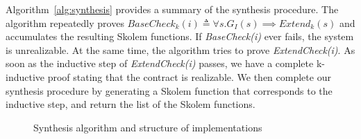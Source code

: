 Algorithm~\ref{alg:synthesis} provides a summary of the synthesis
procedure. The algorithm repeatedly proves $\mathit{BaseCheck_k(i)} \triangleq
\forall s. G_I(s) \implies \mathit{Extend}_k(s)$ and accumulates the resulting Skolem functions. If
\textit{BaseCheck(i)} ever fails, the system is unrealizable. At the same time, the
algorithm tries to prove \textit{ExtendCheck(i)}. As soon as the
inductive step of \textit{ExtendCheck(i)} passes, we have a complete
k-inductive proof stating that the contract is realizable. We then
complete our synthesis procedure by generating a Skolem function that
corresponds to the inductive step, and return the list of the
Skolem functions.

\begin{figure}
\begin{minipage}[t]{0.65\textwidth}
\end{minipage}
\hspace{-1.5cm}
\begin{minipage}[t]{0.38\textwidth}
\end{minipage}
\caption{Synthesis algorithm and structure of implementations}
\label{fig:synthalg}
\end{figure}


